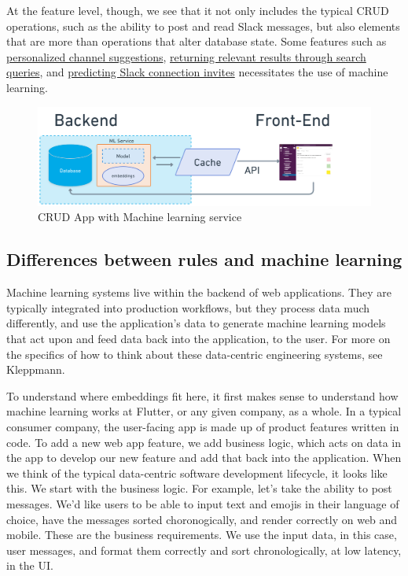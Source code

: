 \documentclass[11pt, table]{diazessay} %
\begin{document}
\begin{sloppypar}
At the feature level, though, we see that it not only includes the typical CRUD operations, such as the ability to post and read Slack messages, but also elements that are more than operations that alter database state. Some features such as \href{https://slack.engineering/personalized-channel-recommendations-in-slack/}{personalized channel suggestions}, \href{https://slack.engineering/search-at-slack/}{returning relevant results through search queries}, and \href{https://slack.engineering/email-classification/}{predicting Slack connection invites} necessitates the use of  machine learning.

\begin{figure}[H]
\centering
\includegraphics[width=\textwidth]{figures/web_service_ml.png}
\caption{CRUD App with Machine learning service}
\end{figure}

\subsection{Differences between rules and machine learning}
Machine learning systems live within the backend of web applications. They are typically integrated into production workflows, but they process data much differently, and use the application's data to generate machine learning models that act upon and feed data back into the application, to the user. For more on the specifics of how to think about these data-centric engineering systems, see Kleppmann\cite{kleppmann2017designing}.

To understand where embeddings fit here, it first  makes sense to understand how machine learning works at Flutter, or any given company, as a whole. In a typical consumer company, the user-facing app is made up of product features written in code. To add a new web app feature, we add business logic, which acts on data in the app to develop our new feature and add that back into the application.  When we think of the typical data-centric software development lifecycle, it looks like this. We start with the business logic. For example, let's take the ability to post messages. We'd like users to be able to input text and emojis in their language of choice, have the messages sorted choronogically, and render correctly on web and mobile. These are the business requirements. We use the input data, in this case, user messages, and format them correctly and sort chronologically, at low latency, in the UI. 


\end{sloppypar}
\end{document}
